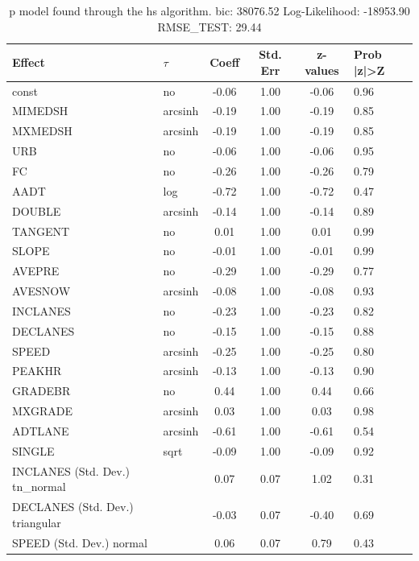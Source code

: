\begin{table}
	\caption{p model found through the hs algorithm. bic: 38076.52 Log-Likelihood: -18953.90 RMSE_TEST: 29.44}
	\begin{center}
		\begin{tabular}{|l|l|c|c|c|l|}
			\hline
			Effect & $\tau$ & Coeff & Std. Err & z-values & Prob |z|>Z \\
			\hline
			const & no & -0.06 & 1.00 & -0.06 & 0.96 \\
			\hline
			MIMEDSH & arcsinh & -0.19 & 1.00 & -0.19 & 0.85 \\
			\hline
			MXMEDSH & arcsinh & -0.19 & 1.00 & -0.19 & 0.85 \\
			\hline
			URB & no & -0.06 & 1.00 & -0.06 & 0.95 \\
			\hline
			FC & no & -0.26 & 1.00 & -0.26 & 0.79 \\
			\hline
			AADT & log & -0.72 & 1.00 & -0.72 & 0.47 \\
			\hline
			DOUBLE & arcsinh & -0.14 & 1.00 & -0.14 & 0.89 \\
			\hline
			TANGENT & no & 0.01 & 1.00 & 0.01 & 0.99 \\
			\hline
			SLOPE & no & -0.01 & 1.00 & -0.01 & 0.99 \\
			\hline
			AVEPRE & no & -0.29 & 1.00 & -0.29 & 0.77 \\
			\hline
			AVESNOW & arcsinh & -0.08 & 1.00 & -0.08 & 0.93 \\
			\hline
			INCLANES & no & -0.23 & 1.00 & -0.23 & 0.82 \\
			\hline
			DECLANES & no & -0.15 & 1.00 & -0.15 & 0.88 \\
			\hline
			SPEED & arcsinh & -0.25 & 1.00 & -0.25 & 0.80 \\
			\hline
			PEAKHR & arcsinh & -0.13 & 1.00 & -0.13 & 0.90 \\
			\hline
			GRADEBR & no & 0.44 & 1.00 & 0.44 & 0.66 \\
			\hline
			MXGRADE & arcsinh & 0.03 & 1.00 & 0.03 & 0.98 \\
			\hline
			ADTLANE & arcsinh & -0.61 & 1.00 & -0.61 & 0.54 \\
			\hline
			SINGLE & sqrt & -0.09 & 1.00 & -0.09 & 0.92 \\
			\hline
			INCLANES (Std. Dev.) tn_normal &  & 0.07 & 0.07 & 1.02 & 0.31 \\
			\hline
			DECLANES (Std. Dev.) triangular &  & -0.03 & 0.07 & -0.40 & 0.69 \\
			\hline
			SPEED (Std. Dev.) normal &  & 0.06 & 0.07 & 0.79 & 0.43 \\

\end{tabular}
\end{center}
\end{table}
